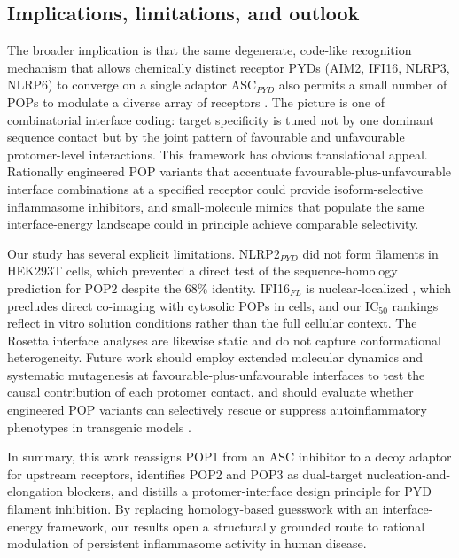 \documentclass[11pt]{article}
\begin{document}
\subsection{Implications, limitations, and outlook}

The broader implication is that the same degenerate, code-like
recognition mechanism that allows chemically distinct receptor PYDs
(AIM2, IFI16, NLRP3, NLRP6) to converge on a single adaptor
ASC$_{PYD}$ also permits a small number of POPs to modulate a diverse
array of receptors \citep{lu2014unified, matyszewski2021distinct,
shen2019nlrp6, hochheiser2022directionality, sharif2019nek7,
andreeva2021nlrp3}. The picture is one of combinatorial interface
coding: target specificity is tuned not by one dominant sequence
contact but by the joint pattern of favourable and unfavourable
protomer-level interactions. This framework has obvious translational
appeal. Rationally engineered POP variants that accentuate
favourable-plus-unfavourable interface combinations at a specified
receptor could provide isoform-selective inflammasome inhibitors, and
small-molecule mimics that populate the same interface-energy
landscape could in principle achieve comparable selectivity.

Our study has several explicit limitations. NLRP2$_{PYD}$ did not form
filaments in HEK293T cells, which prevented a direct test of the
sequence-homology prediction for POP2 despite the 68\% identity.
IFI16$_{FL}$ is nuclear-localized \citep{kerur2011ifi16}, which
precludes direct co-imaging with cytosolic POPs in cells, and our
IC$_{50}$ rankings reflect in vitro solution conditions rather than the
full cellular context. The Rosetta interface analyses are likewise
static and do not capture conformational heterogeneity. Future work
should employ extended molecular dynamics and systematic mutagenesis
at favourable-plus-unfavourable interfaces to test the causal
contribution of each protomer contact, and should evaluate whether
engineered POP variants can selectively rescue or suppress
autoinflammatory phenotypes in transgenic models
\citep{sharma2018pyrin, vora2021inflammasome}.

In summary, this work reassigns POP1 from an ASC inhibitor to a decoy
adaptor for upstream receptors, identifies POP2 and POP3 as dual-target
nucleation-and-elongation blockers, and distills a protomer-interface
design principle for PYD filament inhibition. By replacing homology-based
guesswork with an interface-energy framework, our results open a
structurally grounded route to rational modulation of persistent
inflammasome activity in human disease.


\end{document}
